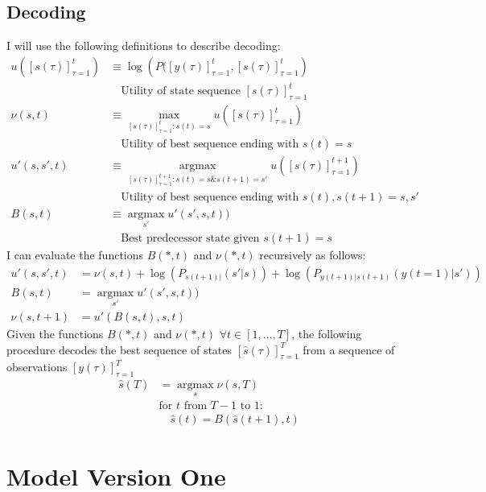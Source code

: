 \documentclass[12pt]{article}
\newcommand{\os}[4]{{\left[ #1(#2) \right]}_{#3}^{#4}} %
\newcommand{\ti}[2]{{#1}{(#2)}}                         %
\newcommand{\ts}[4]{\os{#1}{#2}{#2=#3}{#4}} %
\newcommand{\argmax}{\operatorname*{argmax}}
\begin{document}
\subsection{Decoding}
\label{sec:decoding}

I will use the following definitions to describe decoding:
\begin{align*}
  u(\ts{s}{\tau}{1}{t}) &\equiv \log \left(
    P(\ts{y}{\tau}{1}{t},\ts{s}{\tau}{1}{t} \right) \\ & \quad
  \text{Utility of state sequence } \ts{s}{\tau}{1}{t}\\
  \nu(s,t) & \equiv \max_{\ts{s}{\tau}{1}{t}:\ti{s}{t}=s}
  u(\ts{s}{\tau}{1}{t}) \\
  & \quad \text{Utility of best sequence ending with } \ti{s}{t} = s \\
  u'(s,s',t) &\equiv
  \argmax_{\ts{s}{\tau}{1}{t+1}:\ti{s}{t}=s \&\ti{s}{t+1}=s'}
  u(\ts{s}{\tau}{1}{t+1}) \\
  & \quad \text{Utility of best sequence ending with }
    \ti{s}{t},\ti{s}{t+1} = s,s' \\
  B(s,t) &\equiv \argmax_{s'} u'(s',s,t)) \\
  & \quad \text{Best predecessor state given } \ti{s}{t+1}=s
\end{align*}
I can evaluate the functions $B(*,t)$ and $\nu(*,t)$ recursively as
follows:
\begin{align*}
  u'(s,s',t) &= \nu(s,t) + \log\left( P_{\ti{s}{t+1}|}(s'|s) \right) +
  \log\left( P_{\ti{y}{t+1}|\ti{s}{t+1}}(\ti{y}{t=1}|s') \right) \\
  B(s,t) &= \argmax_{s'} u'(s',s,t)) \\
  \nu(s,t+1) &= u'(B(s,t),s,t)
\end{align*}
Given the functions $B(*,t)$ and $\nu(*,t)$ $\forall
t\in[1,\ldots,T]$, the following procedure decodes the best sequence
of states $ \ts{\hat s}{\tau}{1}{T}$ from a sequence of observations $
\ts{y}{\tau}{1}{T}$
\begin{align*}
  {\ti{{\hat s}}{T}} &= \argmax_s \nu(s,T) \\
  & \text{for } t \text{ from } T-1 \text{ to } 1: \\
  & \quad \ti{\hat s}{t} = B( \ti{\hat s}{t+1},t)
\end{align*}

\section{Model Version One}
\label{sec:model1}
\end{document}
